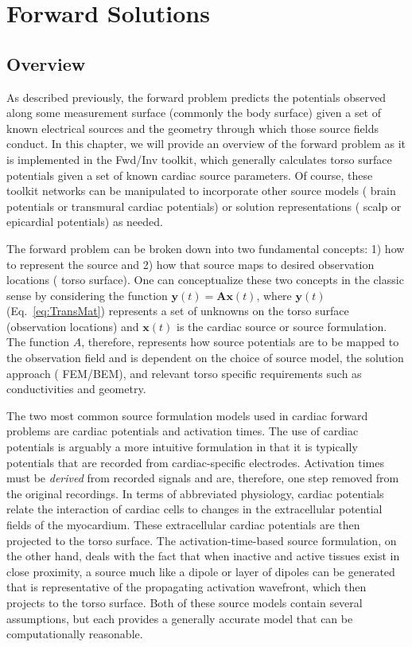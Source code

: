 \chapter{Forward Solutions}\label{ch:fwd}

\section{Overview}

As described previously, the forward problem predicts the potentials observed along some measurement surface (commonly the body surface) given a set of known electrical sources and the geometry through which those source fields conduct. In this chapter, we will provide an overview of the forward problem as it is implemented in the Fwd/Inv toolkit, which generally calculates torso surface potentials given a set of known cardiac source parameters. Of course, these toolkit networks can be manipulated to incorporate other source models (\eg{} brain potentials or transmural cardiac potentials) or solution representations (\eg{} scalp or epicardial potentials) as needed. 

The forward problem can be broken down into two fundamental concepts: 1) how to represent the source and 2) how that source maps to desired observation locations (\eg{} torso surface). One can conceptualize these two concepts in the classic sense by considering the function $\mathbf{y}(t) = \mathbf{A}\mathbf{x}(t)$,  where $\mathbf{y}(t)$ (Eq.~\ref{eq:TransMat}) represents a set of unknowns on the torso surface (observation locations) and $\mathbf{x}(t)$ is the cardiac source or source formulation. The function $A$, therefore, represents how source potentials are to be mapped to the observation field and is dependent on the choice of source model, the solution approach (\ie{} FEM/BEM), and relevant torso specific requirements such as conductivities and geometry.

The two most common source formulation models used in cardiac forward problems are cardiac potentials and activation times. The use of cardiac potentials is arguably a more intuitive formulation in that it is typically potentials that are recorded from cardiac-specific electrodes.  Activation times must be {\em derived} from recorded signals and are, therefore, one step removed from the original recordings.  In terms of abbreviated physiology, cardiac potentials relate the interaction of cardiac cells to changes in the extracellular potential fields of the myocardium. These extracellular cardiac potentials are then projected to the torso surface. The activation-time-based source formulation, on the other hand, deals with the fact that when inactive and active tissues exist in close proximity, a source much like a dipole or layer of dipoles can be generated that is representative of the propagating activation wavefront, which then projects to the torso surface. Both of these source models contain several assumptions, but each provides a generally accurate model that can be computationally reasonable.

